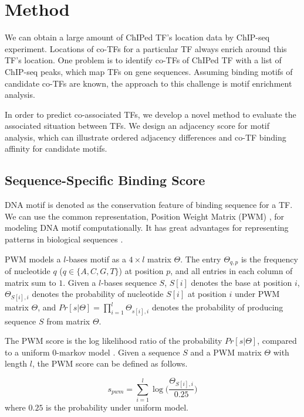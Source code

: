 \documentclass[journal,transmag]{IEEEtran}
\begin{document}
\section{Method}


We can obtain a large amount of ChIPed TF's location data by
ChIP-seq \cite{mybibfile:chipseq} experiment. Locations of co-TFs
for a particular TF always enrich around this TF's location. One
problem is to identify co-TFs of ChIPed TF with a list of ChIP-seq
peaks, which map TFs on gene sequences. Assuming binding motifs of
candidate co-TFs are known, the approach to this challenge is motif
enrichment analysis.


In order to predict co-associated TFs, we develop a novel method to
evaluate the associated situation between TFs. We design an
adjacency score for motif analysis, which can illustrate ordered
adjacency differences and co-TF binding affinity for candidate
motifs.


\subsection{Sequence-Specific Binding Score}

DNA motif is denoted as the conservation feature of binding sequence
for a TF. We can use the common representation, Position Weight
Matrix (PWM) \cite{mybibfile:pwm}, for modeling DNA motif
computationally. It has great advantages for representing patterns
in biological sequences \cite{mybibfile:pwmadv}.


PWM models a $l$-bases motif as a $4 \times l$ matrix $\Theta$. The
entry $\Theta_{q,p}$ is the frequency of nucleotide $q$ ($q\in\{A,
C, G, T\}$) at position $p$, and all entries in each column of
matrix sum to $1$. Given a $l$-bases sequence $S$, $S[i]$ denotes
the base at position $i$, $\Theta_{S[i],i}$ denotes the probability
of nucleotide $S[i]$ at position $i$ under PWM matrix $\Theta$, and
$Pr[s|\Theta]=\prod_{i=1}^{l}\Theta_{s[i],i}$ denotes the
probability of producing sequence $S$ from matrix $\Theta$.


The PWM score is the log likelihood ratio of the probability
$Pr[s|\Theta]$, compared to a uniform $0$-markov model
\cite{mybibfile:markovmodel01,mybibfile:markovmodel02}. Given a
sequence $S$ and a PWM matrix $\Theta$ with length $l$, the PWM
score can be defined as follows.

\begin{equation}
\label{pwm_equation} s_{pwm} =
\sum\limits_{i=1}^{l}\log\Big(\frac{\Theta_{S[i],i}}{0.25}\Big)
\end{equation}
where $0.25$ is the probability under uniform model.
\end{document}
